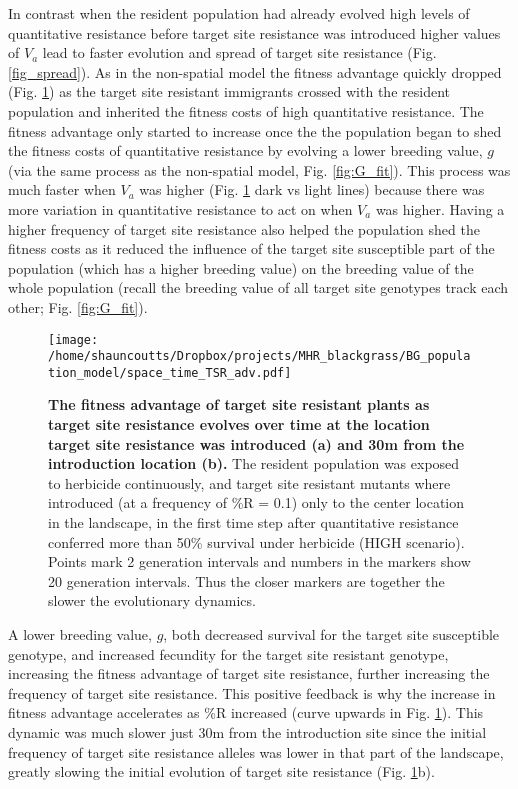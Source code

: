 \documentclass[10pt,letterpaper]{article}
\begin{document}
In contrast when the resident population had already evolved high levels of quantitative resistance before target site resistance was introduced higher values of $V_a$ lead to faster evolution and spread of target site resistance (Fig. \ref{fig_spread}). As in the non-spatial model the fitness advantage quickly dropped (Fig. \ref{fig:ts_TSR_adv}) as the target site resistant immigrants crossed with the resident population and inherited the fitness costs of high quantitative resistance. The fitness advantage only started to increase once the the population began to shed the fitness costs of quantitative resistance by evolving a lower breeding value, $g$ (via the same process as the non-spatial model, Fig. \ref{fig:G_fit}). This process was much faster when $V_a$ was higher (Fig. \ref{fig:ts_TSR_adv} dark vs light lines) because there was more variation in quantitative resistance to act on when $V_a$ was higher. Having a higher frequency of target site resistance also helped the population shed the fitness costs as it reduced the influence of the target site susceptible part of the population (which has a higher breeding value) on the breeding value of the whole population (recall the breeding value of all target site genotypes track each other; Fig. \ref{fig:G_fit}). 

\begin{figure}[!h] 
\texttt{[image: /home/shauncoutts/Dropbox/projects/MHR\_blackgrass/BG\_population\_model/space\_time\_TSR\_adv.pdf]} 
\caption{{\bf The fitness advantage of target site resistant plants as target site resistance evolves over time at the location target site resistance was introduced (a) and 30m from the introduction location (b).} The resident population was exposed to herbicide continuously, and target site resistant mutants where introduced (at a frequency of \%R = 0.1) only to the center location in the landscape, in the first time step after quantitative resistance conferred more than 50\% survival under herbicide (HIGH scenario). Points mark 2 generation intervals and numbers in the markers show 20 generation intervals. Thus the closer markers are together the slower the evolutionary dynamics.} 
\label{fig:ts_TSR_adv}
\end{figure}

A lower breeding value, $g$, both decreased survival for the target site susceptible genotype, and increased fecundity for the target site resistant genotype, increasing the fitness advantage of target site resistance, further increasing the frequency of target site resistance. This positive feedback is why the increase in fitness advantage accelerates as \%R increased (curve upwards in Fig. \ref{fig:ts_TSR_adv}). This dynamic was much slower just 30m from the introduction site since the initial frequency of target site resistance alleles was lower in that part of the landscape, greatly slowing the initial evolution of target site resistance (Fig. \ref{fig:ts_TSR_adv}b).     
\end{document}

